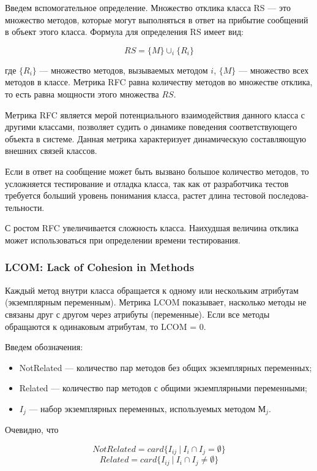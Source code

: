 \documentclass{../../text-style}
\begin{document}
Введем вспомогательное определение. Множество отклика класса RS --- это множе­ство методов, которые могут выполняться в ответ на прибытие сообщений в объект этого класса. Формула для определения RS имеет вид:

$$RS = \{M\} \cup_{i} \{R_i\}$$

где $\{R_i\}$ --- множество методов, вызываемых методом $i$, $\{M\}$ --- множество всех методов в классе. Метрика RFC равна количеству методов во множестве отклика, то есть равна мощности этого множества $RS$.

Метрика RFC является мерой потенциального взаимодействия данного класса с другими классами, позволяет судить о динамике поведения соответствующего объекта в системе. Данная метрика характеризует динамическую составляющую внешних связей классов.

Если в ответ на сообщение может быть вызвано большое количество методов, то усложняется тестирование и отладка класса, так как от разработчика тестов требуется больший уровень понимания класса, растет длина тестовой последова­тельности.

С ростом RFC увеличивается сложность класса. Наихудшая величина отклика может использоваться при определении времени тестирования.

\subsubsection{LCOM: Lack of Cohesion in Methods}

Каждый метод внутри класса обращается к одному или нескольким атрибутам (экземплярным переменным). Метрика LCOM показывает, насколько методы не связаны друг с другом через атрибуты (переменные). Если все методы обращаются к одинаковым атрибутам, то LCOM = 0.

Введем обозначения:

\begin{itemize}
    \item NotRelated --- количество пар методов без общих экземплярных переменных;
    \item Related --- количество пар методов с общими экземплярными переменными;
    \item $I_j$ --- набор экземплярных переменных, используемых методом $М_j$.
\end{itemize}

Очевидно, что

$$NotRelated = card\{I_{ij}\ |\ I_i \cap I_j = \emptyset\}$$
$$Related = card\{I_{ij}\ |\ I_i \cap I_j \neq \emptyset\}$$
\end{document}

